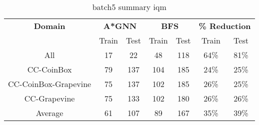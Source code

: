 \begin{table}[!ht]
  \small
  \centering
  \begin{tabular}{c|cc|cc|cc}
    \textbf{Domain}
      & \multicolumn{2}{c|}{\textbf{A*GNN}}
      & \multicolumn{2}{c|}{\textbf{BFS}}
      & \multicolumn{2}{c}{\textbf{\% Reduction}} \\
    \cline{2-7}
    & Train & Test & Train & Test & Train & Test \\
    \hline

    All & 17 & 22 & 48 & 118 & 64\% & 81\% \\
    CC-CoinBox & 79 & 137 & 104 & 185 & 24\% & 25\% \\
    CC-CoinBox-Grapevine & 75 & 137 & 102 & 185 & 26\% & 25\% \\
    CC-Grapevine & 75 & 133 & 102 & 180 & 26\% & 26\% \\
    \hline
    Average & 61 & 107 & 89 & 167 & 35\% & 39\% \\

  \end{tabular}
  \caption{batch5 summary iqm}
  \label{tab:batch5_res}
\end{table}
